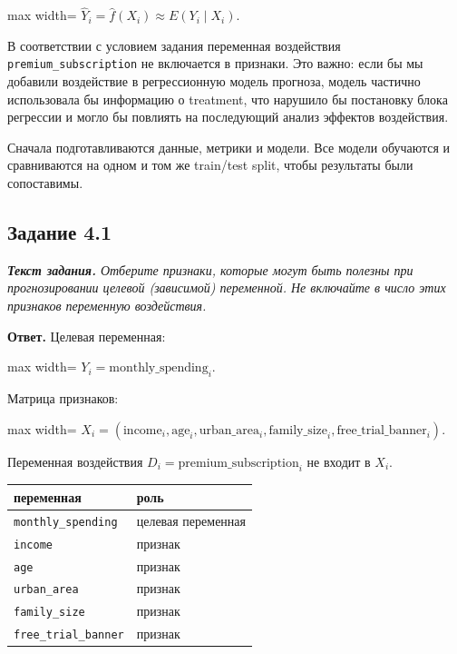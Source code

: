 \documentclass[11pt]{article}
\newcounter{none}
\newenvironment{tasktext}
      {\begin{tcolorbox}[breakable, colback=black!3, colframe=black!28,
        boxrule=0.4pt, arc=1.5mm, left=7pt, right=7pt, top=5pt, bottom=5pt,
        before skip=0.35em, after skip=0.75em]\itshape}
      {\end{tcolorbox}}
\begin{document}
\begin{center}
\begin{adjustbox}{max width=\linewidth}
\(\displaystyle \hat Y_i = \hat f(X_i) \approx E(Y_i \mid X_i).\)
\end{adjustbox}
\end{center}

В соответствии с условием задания переменная воздействия
\texttt{premium\_subscription} не включается в признаки. Это важно: если
бы мы добавили воздействие в регрессионную модель прогноза, модель
частично использовала бы информацию о treatment, что нарушило бы
постановку блока регрессии и могло бы повлиять на последующий анализ
эффектов воздействия.

Сначала подготавливаются данные, метрики и модели. Все модели обучаются
и сравниваются на одном и том же train/test split, чтобы результаты были
сопоставимы.

    \subsection{Задание 4.1}\label{ux437ux430ux434ux430ux43dux438ux435-4.1}

\begin{tasktext}
\textbf{Текст задания.} Отберите признаки, которые могут быть полезны
при прогнозировании целевой (зависимой) переменной. Не включайте в число
этих признаков переменную воздействия.
\end{tasktext}

\textbf{Ответ.} Целевая переменная:

\begin{center}
\begin{adjustbox}{max width=\linewidth}
\(\displaystyle Y_i = \text{monthly\_spending}_i.\)
\end{adjustbox}
\end{center}

Матрица признаков:

\begin{center}
\begin{adjustbox}{max width=\linewidth}
\(\displaystyle X_i = (\text{income}_i, \text{age}_i, \text{urban\_area}_i, \text{family\_size}_i, \text{free\_trial\_banner}_i).\)
\end{adjustbox}
\end{center}

Переменная воздействия \(D_i = \text{premium\_subscription}_i\) не
входит в \(X_i\).

{\def\LTcaptype{none} %
\begin{longtable}[]{@{}ll@{}}
\toprule\noalign{}
переменная & роль \\
\midrule\noalign{}
\endhead
\bottomrule\noalign{}
\endlastfoot
\texttt{monthly\_spending} & целевая переменная \\
\texttt{income} & признак \\
\texttt{age} & признак \\
\texttt{urban\_area} & признак \\
\texttt{family\_size} & признак \\
\texttt{free\_trial\_banner} & признак \\
\end{longtable}
}
\end{document}
